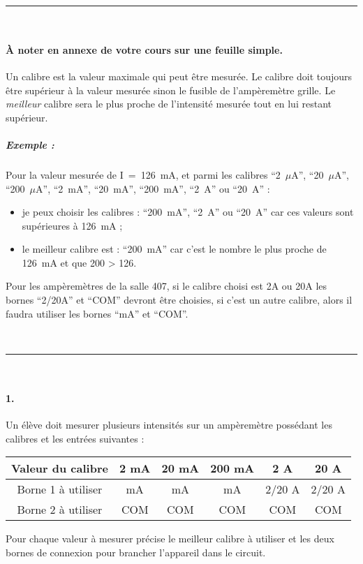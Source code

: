 \documentclass[12pt, a4paper]{article}
\begin{document}
~ \hfill \rule{0.5\linewidth}{0.5pt} \hfill ~

\paragraph{À noter en annexe de votre cours sur une feuille simple.} {\color{red}Un calibre est la valeur maximale qui peut être mesurée. 
Le calibre doit toujours être supérieur à la valeur mesurée sinon le fusible de l'ampèremètre grille. 
Le \emph{meilleur} calibre sera le plus proche de l'intensité mesurée tout en lui restant supérieur.}

\subparagraph*{Exemple :} Pour la valeur mesurée de I~=~126~mA, et parmi les calibres ``2~$\mu$A'', ``20~$\mu$A'', ``200~$\mu$A'', ``2~mA'', ``20~mA'', ``200~mA'', ``2~A'' ou ``20~A'' :
\begin{itemize}
	\item je peux choisir les calibres : ``200~mA'', ``2~A'' ou ``20~A'' car ces valeurs sont supérieures à 126~mA ;
	\item le meilleur calibre est : ``200~mA'' car c'est le nombre le plus proche de 126~mA et que 200 > 126.
\end{itemize}

Pour les ampèremètres de la salle 407, si le calibre choisi est 2A ou 20A les bornes ``2/20A'' et ``COM'' devront être choisies, si c'est un autre calibre, alors il faudra utiliser les bornes ``mA'' et ``COM''.

~ \hfill \rule{0.5\linewidth}{0.5pt} \hfill ~

\paragraph{1.} Un élève doit mesurer plusieurs intensités sur un ampèremètre possédant les calibres et les entrées suivantes :
\begin{table}[H]
	\centering
	\begin{tabular}{c c c c c c}
		Valeur du calibre & 2 mA & 20 mA & 200 mA & 2 A & 20 A \\
		\hline\hline
		Borne 1 à utiliser & mA & mA & mA & 2/20 A & 2/20 A \\
		Borne 2 à utiliser & COM & COM & COM & COM & COM \\
	\end{tabular}
\end{table}

Pour chaque valeur à mesurer précise le meilleur calibre à utiliser et les deux bornes de connexion pour brancher l'appareil dans le circuit.
\end{document}

